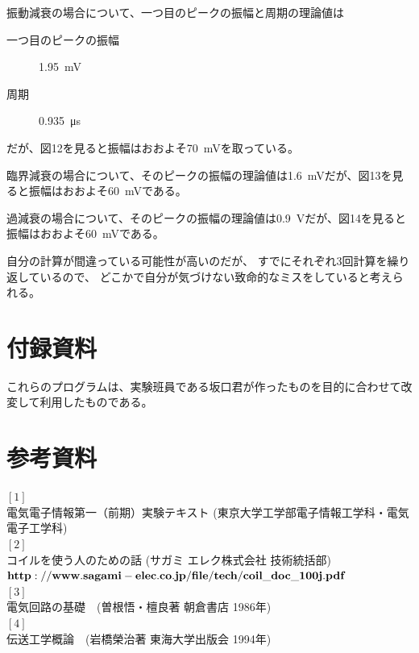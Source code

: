 \documentclass[10pt,a4j,dvipdfmx]{jsarticle}
\begin{document}
振動減衰の場合について、一つ目のピークの振幅と周期の理論値は
\begin{description}
 \item[一つ目のピークの振幅] \SI{1.95}{\milli\volt}
 \item[周期] \SI{0.935}{\micro\second}
\end{description}
だが、図12を見ると振幅はおおよそ\SI{70}{\milli\volt}を取っている。

臨界減衰の場合について、そのピークの振幅の理論値は\SI{1.6}{\milli\volt}だが、図13を見ると振幅はおおよそ\SI{60}{\milli\volt}である。

過減衰の場合について、そのピークの振幅の理論値は\SI{0.9}{\volt}だが、図14を見ると振幅はおおよそ\SI{60}{\milli\volt}である。

自分の計算が間違っている可能性が高いのだが、
すでにそれぞれ3回計算を繰り返しているので、
どこかで自分が気づけない致命的なミスをしていると考えられる。

\section{付録資料}
これらのプログラムは、実験班員である坂口君が作ったものを目的に合わせて改変して利用したものである。



\section{参考資料}
$[1]$ \\
電気電子情報第一（前期）実験テキスト (東京大学工学部電子情報工学科・電気電子工学科)\\
$[2]$ \\
コイルを使う人のための話 (サガミ エレク株式会社 技術統括部) \\
$\bf{http://www.sagami-elec.co.jp/file/tech/coil\_doc\_100j.pdf}$\\
$[3]$ \\
電気回路の基礎　(曽根悟・檀良著 朝倉書店 1986年) \\
$[4]$ \\
伝送工学概論　(岩橋榮治著 東海大学出版会 1994年) \\
\end{document}
